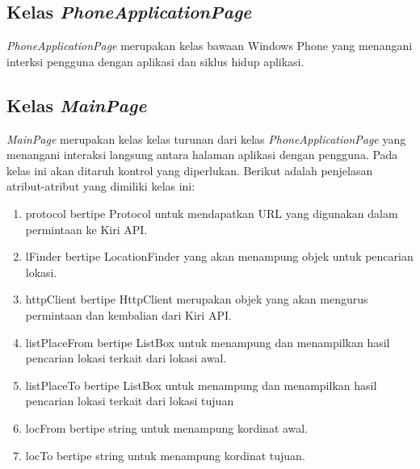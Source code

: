 \subsection{Kelas \textit{PhoneApplicationPage}}
\label{lab:Kelas PhoneApplicationPage}
\hspace{0.5cm} \textit{PhoneApplicationPage} merupakan kelas bawaan Windows Phone yang menangani interksi pengguna dengan aplikasi dan siklus hidup aplikasi.

\subsection{Kelas \textit{MainPage}}
\label{lab:Kelas MainPage}
\hspace{0.5cm} \textit{MainPage} merupakan kelas kelas turunan dari kelas \textit{PhoneApplicationPage} yang menangani interaksi langsung antara halaman aplikasi dengan pengguna. Pada kelas ini akan ditaruh kontrol yang diperlukan. Berikut adalah penjelasan atribut-atribut yang dimiliki kelas ini:
\begin{enumerate}
	\item protocol bertipe Protocol untuk mendapatkan URL yang digunakan dalam permintaan ke Kiri API.
	\item lFinder bertipe LocationFinder yang akan menampung objek untuk pencarian lokasi.
	\item httpClient bertipe HttpClient merupakan objek yang akan mengurus permintaan dan kembalian dari Kiri API.
	\item listPlaceFrom bertipe ListBox untuk menampung dan menampilkan hasil pencarian lokasi terkait dari lokasi awal.
	\item listPlaceTo bertipe ListBox untuk menampung dan menampilkan hasil pencarian lokasi terkait dari lokasi tujuan
	\item locFrom bertipe string untuk menampung kordinat awal.
	\item locTo bertipe string untuk menampung kordinat tujuan.
\end{enumerate}

